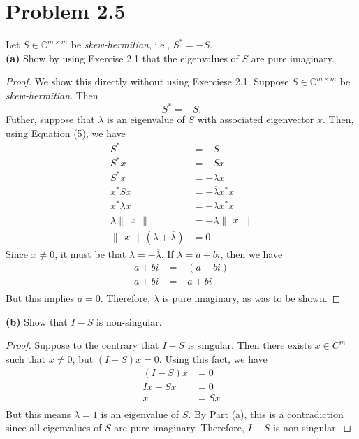 \documentclass{article}
\begin{document}
\section*{Problem 2.5}
Let $S\in \mathbb{C}^{m \times m}$ be \textit{skew-hermitian}, i.e., $S^* = -S$.\\

\textbf{(a)} Show by using Exercise 2.1 that the eigenvalues of $S$ are pure imaginary.
\begin{proof}
    We show this directly without using Exerciese 2.1. Suppose $S\in \mathbb{C}^{m \times m}$ be \textit{skew-hermitian}. Then 
    \begin{equation}
        S^* = -S.    
    \end{equation}
    Futher, suppose that $\lambda$ is an eigenvalue of $S$ with associated eigenvector $x$. Then, using Equation (5), we have
    \begin{align*}
        S^* &= -S\\
        S^*x &= -Sx\\
        S^*x &= -\lambda x\\
        x^*Sx &= -\overline{\lambda}x^*x\\
        x^*\lambda x &= -\overline{\lambda}x^*x\\
        \lambda \begin{Vmatrix}
            x
        \end{Vmatrix} &= -\overline{\lambda}\begin{Vmatrix}
            x
        \end{Vmatrix}\\
        \begin{Vmatrix}
            x
        \end{Vmatrix}(\lambda + \overline{\lambda}) &= 0
    \end{align*}
    Since $x \neq 0$, it must be that $\lambda = -\overline{\lambda}$. If $\lambda = a + bi$, then we have
    \begin{align*}
        a+bi &= -(a - bi)\\
        a + bi &= -a + bi\\
    \end{align*}
    But this implies $a=0$. Therefore, $\lambda$ is pure imaginary, as was to be shown.
\end{proof}

\textbf{(b)} Show that $I-S$ is non-singular.
\begin{proof}
    Suppose to the contrary that $I-S$ is singular. Then there exists $x \in C^m$ such that $x \neq 0$, but $(I-S)x = 0$. Using this fact, we have
    \begin{align*}
        (I-S)x &= 0\\
        Ix - Sx &= 0\\
        x &= Sx\\
    \end{align*}
    But this means $\lambda = 1$ is an eigenvalue of $S$. By Part (a), this is a contradiction since all eigenvalues of $S$ are pure imaginary. Therefore, $I-S$ is non-singular.
\end{proof}
\end{document}
